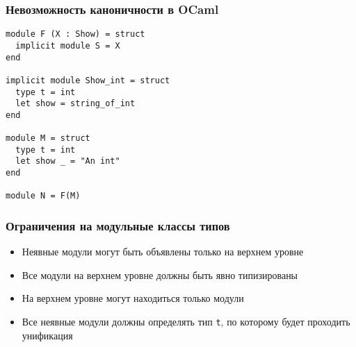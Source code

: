 \documentclass{beamer}
\newcommand{\backupend}{
   \addtocounter{framenumberappendix}{-\value{framenumber}}
   \addtocounter{framenumber}{\value{framenumberappendix}} 
}
\begin{document}
\lstset{language=caml}
\begin{frame}[fragile]\frametitle{Невозможность каноничности в OCaml}
\begin{lstlisting}
module F (X : Show) = struct
  implicit module S = X
end

implicit module Show_int = struct
  type t = int
  let show = string_of_int
end

module M = struct
  type t = int
  let show _ = "An int"
end

module N = F(M)
\end{lstlisting}
\end{frame}


\begin{frame}\frametitle{Ограничения на модульные классы типов}
\begin{itemize}
  \item Неявные модули могут быть объявлены только на верхнем уровне
  \item Все модули на верхнем уровне должны быть явно типизированы
  \item На верхнем уровне могут находиться только модули
  \item Все неявные модули должны определять тип \texttt{t}, по которому будет проходить унификация 
\end{itemize}
\end{frame}


\backupend
\end{document}

